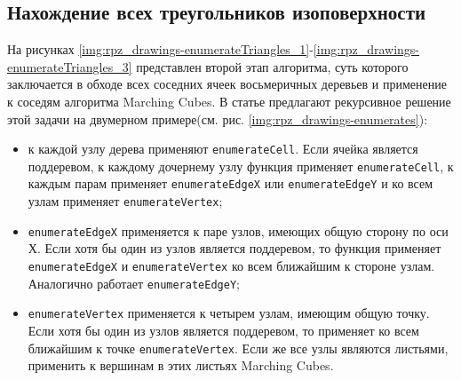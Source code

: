
\clearpage


\clearpage


\subsection{Нахождение всех треугольников изоповерхности}

На рисунках \ref{img:rpz_drawings-enumerateTriangles_1}-\ref{img:rpz_drawings-enumerateTriangles_3} представлен второй этап алгоритма, суть которого заключается в обходе всех соседних ячеек восьмеричных деревьев и применение к соседям алгоритма Marching Cubes. В статье\cite{dmc} предлагают рекурсивное решение этой задачи на двумерном примере(см. рис. \ref{img:rpz_drawings-enumerates}):
\begin{itemize}
    \item к каждой узлу дерева применяют \texttt{enumerateCell}. Если ячейка является поддеревом, к каждому дочернему узлу функция применяет \texttt{enumerateCell}, к каждым парам применяет \texttt{enumerateEdgeX} или \texttt{enumerateEdgeY} и ко всем узлам применяет \texttt{enumerateVertex};
    \item \texttt{enumerateEdgeX} применяется к паре узлов, имеющих общую сторону по оси Х. Если хотя бы один из узлов является поддеревом, то функция применяет \texttt{enumerateEdgeX} и \texttt{enumerateVertex} ко всем ближайшим к стороне узлам. Аналогично работает \texttt{enumerateEdgeY};
    \item \texttt{enumerateVertex} применяется к четырем узлам, имеющим общую точку. Если хотя бы один из узлов является поддеревом, то применяет ко всем ближайшим к точке \texttt{enumerateVertex}. Если же все узлы являются листьями, применить к вершинам в этих листьях Marching Cubes.
\end{itemize}


